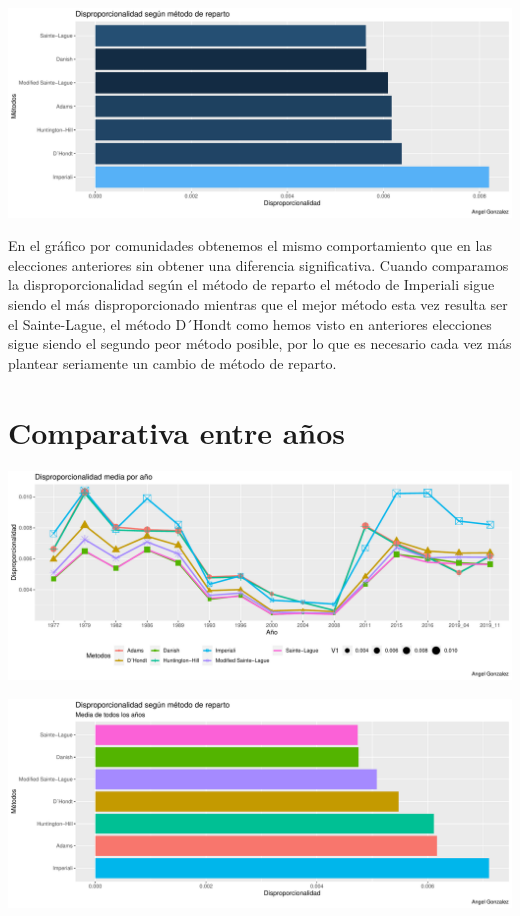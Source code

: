 \documentclass[12pt,a4paper,]{book}
\numberwithin{dummy}{section}
\theoremstyle{ocrenumbox}
\theoremstyle{blacknumex}
\theoremstyle{blacknumbox}
\theoremstyle{ocrenum}
\theoremstyle{ocrenum}
\begin{document}
\begin{center}\includegraphics[width=0.95\linewidth]{figurasR/unnamed-chunk-186-2} \end{center}

En el gráfico por comunidades obtenemos el mismo comportamiento que en
las elecciones anteriores sin obtener una diferencia significativa.
Cuando comparamos la disproporcionalidad según el método de reparto el
método de Imperiali sigue siendo el más disproporcionado mientras que el
mejor método esta vez resulta ser el Sainte-Lague, el método D´Hondt
como hemos visto en anteriores elecciones sigue siendo el segundo peor
método posible, por lo que es necesario cada vez más plantear seriamente
un cambio de método de reparto.

\hypertarget{comparativa-entre-auxf1os}{%
\section{Comparativa entre años}\label{comparativa-entre-auxf1os}}

\begin{center}\includegraphics[width=0.95\linewidth]{figurasR/unnamed-chunk-187-1} \end{center}

\begin{center}\includegraphics[width=0.95\linewidth]{figurasR/unnamed-chunk-187-2} \end{center}
\end{document}

